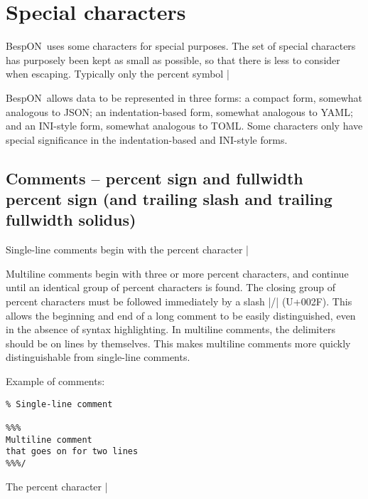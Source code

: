\documentclass[11pt]{article}
\newcommand{\bespon}{BespON}
\begin{document}
\section{Special characters}


\bespon\ uses some characters for special purposes.  The set of special characters has purposely been kept as small as possible, so that there is less to consider when escaping.  Typically only the percent symbol |%

\bespon\ allows data to be represented in three forms:  a compact form, somewhat analogous to JSON; an indentation-based form, somewhat analogous to YAML; and an INI-style form, somewhat analogous to TOML.  Some characters only have special significance in the indentation-based and INI-style forms.


\subsection{Comments -- percent sign and fullwidth percent sign (and trailing slash and trailing fullwidth solidus)}

Single-line comments begin with the percent character |%

Multiline comments begin with three or more percent characters, and continue until an identical group of percent characters is found.  The closing group of percent characters must be followed immediately by a slash |/| (U+002F).  This allows the beginning and end of a long comment to be easily distinguished, even in the absence of syntax highlighting.  In multiline comments, the delimiters should be on lines by themselves.  This makes multiline comments more quickly distinguishable from single-line comments.

Example of comments:
\begin{Verbatim}
% Single-line comment

%%% 
Multiline comment
that goes on for two lines
%%%/
\end{Verbatim}

The percent character |%
\end{document}
